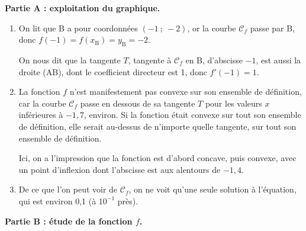 \medskip

\textbf{Partie A : exploitation du graphique.}

\medskip

\begin{enumerate}
	\item On lit que B a pour coordonnées $(-1~;~-2)$, or la courbe $\mathcal{C}_f$ passe par B, donc $f(-1) = f(x_\mathrm{B}) = y_\mathrm{B} = -2$.

	On nous dit que la tangente $T$, tangente à $\mathcal{C}_f$ en B, d'abscisse $-1$, est aussi la droite (AB), dont le coefficient directeur est 1, donc $f'(-1) = 1$.

	\item La fonction $f$ n'est manifestement pas convexe sur son ensemble de définition, car la courbe $\mathcal{C}_f$ passe en dessous de sa tangente $T$ pour les valeurs $x$ inférieures à $- 1,7$, environ. Si la fonction était convexe sur tout son ensemble de définition, elle serait au-dessus de n'importe quelle tangente, sur tout son ensemble de définition.

Ici, on a l'impression que la fonction est d'abord concave, puis convexe, avec un point d'inflexion dont l'abscisse est aux alentours de $-1,4$.

	\item De ce que l'on peut voir de $\mathcal{C}_f$, on ne voit qu'une seule solution à l'équation, qui est environ 0,1 (à $10^{-1}$ près).
\end{enumerate}

\medskip

\textbf{Partie B : étude de la fonction $f$.}

\medskip

